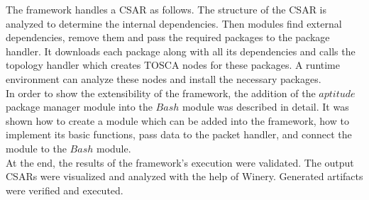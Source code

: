 The framework handles a CSAR as follows.
The structure of the CSAR is analyzed to determine the internal dependencies.
Then modules find external dependencies, remove them and pass the required packages to the package handler.
It downloads each package along with all its dependencies and calls the topology handler which creates TOSCA nodes for these packages.
A runtime environment can analyze these nodes and install the necessary packages.\\
In order to show the extensibility of the framework, the addition of the $aptitude$ package manager module into the $Bash$ module was described in detail.
It  was shown how to create a module which can be added into the framework, how to implement its basic functions, pass data to the packet handler, and connect the module to the $Bash$ module. \\
At the end, the results of the framework's execution were validated.
The output CSARs were visualized and analyzed with the help of Winery.
Generated artifacts were verified and executed.
